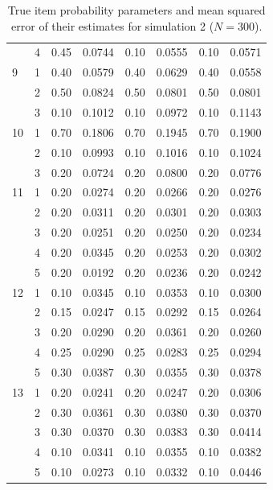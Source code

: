 \begin{table}[H]
\begin{tabular}{llcccccc}
   & 4 & 0.45 & 0.0744 & 0.10 & 0.0555 & 0.10 & 0.0571 \\ 
  9 & 1 & 0.40 & 0.0579 & 0.40 & 0.0629 & 0.40 & 0.0558 \\ 
   & 2 & 0.50 & 0.0824 & 0.50 & 0.0801 & 0.50 & 0.0801 \\ 
   & 3 & 0.10 & 0.1012 & 0.10 & 0.0972 & 0.10 & 0.1143 \\ 
  10 & 1 & 0.70 & 0.1806 & 0.70 & 0.1945 & 0.70 & 0.1900 \\ 
   & 2 & 0.10 & 0.0993 & 0.10 & 0.1016 & 0.10 & 0.1024 \\ 
   & 3 & 0.20 & 0.0724 & 0.20 & 0.0800 & 0.20 & 0.0776 \\ 
  11 & 1 & 0.20 & 0.0274 & 0.20 & 0.0266 & 0.20 & 0.0276 \\ 
   & 2 & 0.20 & 0.0311 & 0.20 & 0.0301 & 0.20 & 0.0303 \\ 
   & 3 & 0.20 & 0.0251 & 0.20 & 0.0250 & 0.20 & 0.0234 \\ 
   & 4 & 0.20 & 0.0345 & 0.20 & 0.0253 & 0.20 & 0.0302 \\ 
   & 5 & 0.20 & 0.0192 & 0.20 & 0.0236 & 0.20 & 0.0242 \\ 
  12 & 1 & 0.10 & 0.0345 & 0.10 & 0.0353 & 0.10 & 0.0300 \\ 
   & 2 & 0.15 & 0.0247 & 0.15 & 0.0292 & 0.15 & 0.0264 \\ 
   & 3 & 0.20 & 0.0290 & 0.20 & 0.0361 & 0.20 & 0.0260 \\ 
   & 4 & 0.25 & 0.0290 & 0.25 & 0.0283 & 0.25 & 0.0294 \\ 
   & 5 & 0.30 & 0.0387 & 0.30 & 0.0355 & 0.30 & 0.0378 \\ 
  13 & 1 & 0.20 & 0.0241 & 0.20 & 0.0247 & 0.20 & 0.0306 \\ 
   & 2 & 0.30 & 0.0361 & 0.30 & 0.0380 & 0.30 & 0.0370 \\ 
   & 3 & 0.30 & 0.0370 & 0.30 & 0.0383 & 0.30 & 0.0414 \\ 
   & 4 & 0.10 & 0.0341 & 0.10 & 0.0355 & 0.10 & 0.0382 \\ 
   & 5 & 0.10 & 0.0273 & 0.10 & 0.0332 & 0.10 & 0.0446 \\ 
   \bottomrule
\end{tabular}
\caption{True item probability parameters and mean squared error of their estimates for simulation 2 ($N = 300$).} 
\label{table:sim2_item_prob_mse_N300}
\end{table}
